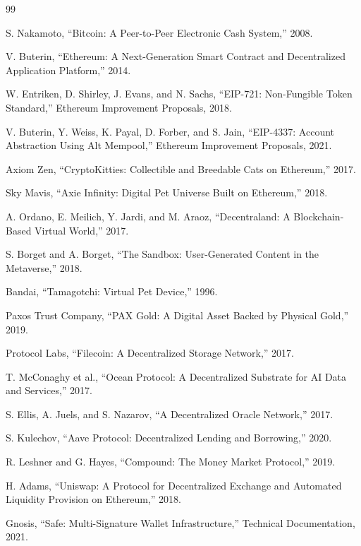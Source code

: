 \documentclass[11pt,letterpaper]{article}
\begin{document}

\begin{thebibliography}{99}

S. Nakamoto, ``Bitcoin: A Peer-to-Peer Electronic Cash System,'' 2008.

V. Buterin, ``Ethereum: A Next-Generation Smart Contract and Decentralized Application Platform,'' 2014.

W. Entriken, D. Shirley, J. Evans, and N. Sachs, ``EIP-721: Non-Fungible Token Standard,'' Ethereum Improvement Proposals, 2018.

V. Buterin, Y. Weiss, K. Payal, D. Forber, and S. Jain, ``EIP-4337: Account Abstraction Using Alt Mempool,'' Ethereum Improvement Proposals, 2021.

Axiom Zen, ``CryptoKitties: Collectible and Breedable Cats on Ethereum,'' 2017.

Sky Mavis, ``Axie Infinity: Digital Pet Universe Built on Ethereum,'' 2018.

A. Ordano, E. Meilich, Y. Jardi, and M. Araoz, ``Decentraland: A Blockchain-Based Virtual World,'' 2017.

S. Borget and A. Borget, ``The Sandbox: User-Generated Content in the Metaverse,'' 2018.

Bandai, ``Tamagotchi: Virtual Pet Device,'' 1996.

Paxos Trust Company, ``PAX Gold: A Digital Asset Backed by Physical Gold,'' 2019.

Protocol Labs, ``Filecoin: A Decentralized Storage Network,'' 2017.

T. McConaghy et al., ``Ocean Protocol: A Decentralized Substrate for AI Data and Services,'' 2017.

S. Ellis, A. Juels, and S. Nazarov, ``A Decentralized Oracle Network,'' 2017.

S. Kulechov, ``Aave Protocol: Decentralized Lending and Borrowing,'' 2020.

R. Leshner and G. Hayes, ``Compound: The Money Market Protocol,'' 2019.

H. Adams, ``Uniswap: A Protocol for Decentralized Exchange and Automated Liquidity Provision on Ethereum,'' 2018.

Gnosis, ``Safe: Multi-Signature Wallet Infrastructure,'' Technical Documentation, 2021.


\end{thebibliography}
\end{document}

